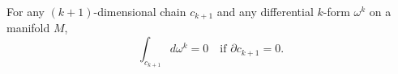 For any $(k+1)$-dimensional chain $c_{k+1}$ and any differential $k$-form $\omega^k$ on a manifold $M$,
$$\int_{c_{k+1}} d\omega^k = 0 \quad \text{if } \partial c_{k+1} = 0.$$
